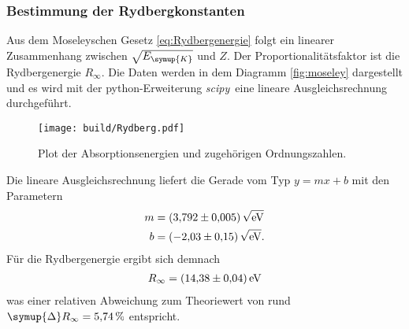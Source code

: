\subsubsection{Bestimmung der Rydbergkonstanten}
Aus dem Moseleyschen Gesetz \eqref{eq:Rydbergenergie} folgt ein linearer Zusammenhang zwischen $\sqrt{E_{\symup{K}}}$ und $Z$. Der 
Proportionalitätsfaktor ist die Rydbergenergie $R_\infty$. Die Daten werden in dem Diagramm \autoref{fig:moseley} dargestellt und es wird
mit der python-Erweiterung \textit{scipy}\,\cite{scipy} eine lineare Ausgleichsrechnung durchgeführt.

\begin{figure}[H]
  \centering
  \texttt{[image: build/Rydberg.pdf]}
  \caption{Plot der Absorptionsenergien und zugehörigen Ordnungszahlen.}
  \label{fig:moseley}
\end{figure}

Die lineare Ausgleichsrechnung liefert die Gerade vom Typ $y = mx +b$ mit den Parametern
\begin{align*}
  m &= \qty{3,792+-0.005}{\sqrt{\unit{\electronvolt}}} \\
  b &= \qty{-2.03+-0.15}{\sqrt{\unit{\electronvolt}}}.
\end{align*}
Für die Rydbergenergie ergibt sich demnach 
\begin{align*}
  R_{\infty} = \qty{14.38+-0.04}{\electronvolt}
\end{align*}
was einer relativen Abweichung zum Theoriewert von rund $\symup{\Delta}R_{\infty} = \qty{5.74}{\percent}$ entspricht.
